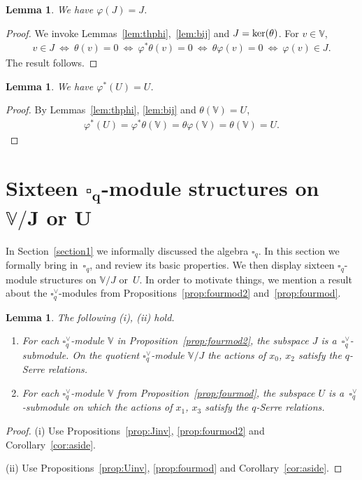 \documentclass[pdftex]{sigma}
\numberwithin{equation}{section}
\newtheorem{Lemma}[Theorem]{Lemma}
\begin{document}
\begin{Lemma}\label{lem:phiJU}We have $\varphi (J) = J$.
\end{Lemma}
\begin{proof} We invoke Lemmas~\ref{lem:thphi},~\ref{lem:bij} and $J={\rm ker}(\theta)$. For $v \in \mathbb V$,
\begin{gather*}
v \in J
\ \Leftrightarrow\
\theta(v) =0
\ \Leftrightarrow\
\varphi^* \theta(v) =0
\ \Leftrightarrow\
\theta \varphi(v) =0
\ \Leftrightarrow\
\varphi(v) \in J.
\end{gather*}
The result follows.
\end{proof}

\begin{Lemma}\label{lem:twoincl}We have $ \varphi^* (U) = U$.
\end{Lemma}
\begin{proof}By Lemmas~\ref{lem:thphi}, \ref{lem:bij} and $\theta(\mathbb V)=U$,
\begin{gather*}
\varphi^*(U) = \varphi^* \theta (\mathbb V) = \theta \varphi (\mathbb V)= \theta (\mathbb V) = U.\tag*{\qed}
\end{gather*}\renewcommand{\qed}{}
\end{proof}

\section[Sixteen $\square_q$-module structures on $\mathbb V/J$ or $U$]{Sixteen $\boldsymbol{\square_q}$-module structures on $\boldsymbol{\mathbb V/J}$ or $\boldsymbol{U}$}\label{section13}

In Section~\ref{section1} we informally discussed the algebra $\square_q$. In this section we formally bring in~$\square_q$, and review its basic properties. We then display sixteen $\square_q$-module structures on $\mathbb V/J$ or~$U$. In order to motivate things, we mention a result about the $\square^\vee_q$-modules from Propositions~\ref{prop:fourmod2} and~\ref{prop:fourmod}.

\begin{Lemma}\label{lem:alwaysUmod}
The following {\rm (i)}, {\rm (ii)} hold.
\begin{enumerate}\itemsep=0pt
\item[\rm (i)] For each $\square^\vee_q$-module $\mathbb V$ in Proposition~{\rm \ref{prop:fourmod2}},
 the subspace $J$ is a~$\square^\vee_q$-submodule. On the quotient $\square^\vee_q$-module $\mathbb V/J$
the actions of $x_0$, $x_2$ satisfy the $q$-Serre relations.
\item[\rm (ii)] For each $\square^\vee_q$-module $\mathbb V$ from Proposition~{\rm \ref{prop:fourmod}},
 the subspace $U$ is a~$\square^\vee_q$-submodule on which the actions of $x_1$, $x_3$ satisfy the $q$-Serre relations.
\end{enumerate}
\end{Lemma}
\begin{proof} (i) Use Propositions~\ref{prop:Jinv}, \ref{prop:fourmod2} and Corollary~\ref{cor:aside}.

 (ii) Use Propositions~\ref{prop:Uinv}, \ref{prop:fourmod} and Corollary~\ref{cor:aside}.
\end{proof}
\end{document}
